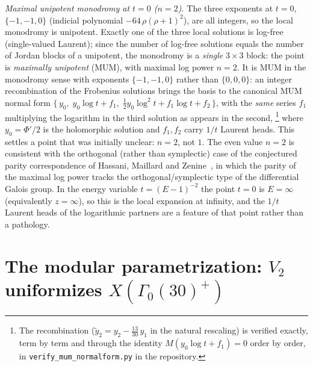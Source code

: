 \documentclass[cntp]{ipart}
\theoremstyle{plain}
\theoremstyle{remark}
\begin{document}
\emph{Maximal unipotent monodromy at $t=0$ ($n=2$).} The three exponents at $t=0$, $\{-1,-1,0\}$ (indicial
polynomial $-64\,\rho(\rho+1)^2$), are all integers, so the local monodromy is unipotent. Exactly one of the three
local solutions is log-free (single-valued Laurent); since the number of log-free solutions equals the number of
Jordan blocks of a unipotent, the monodromy is a \emph{single} $3\times3$ block: the point is \emph{maximally
unipotent} (MUM), with maximal log power $n=2$. It is MUM in the monodromy sense with exponents $\{-1,-1,0\}$
rather than $\{0,0,0\}$: an integer recombination of the Frobenius solutions brings the basis to the canonical MUM
normal form $\{\,y_0,\;y_0\log t+f_1,\;\tfrac12 y_0\log^2t+f_1\log t+f_2\,\}$, with the \emph{same} series $f_1$
multiplying the logarithm in the third solution as appears in the second,%
\footnote{The recombination ($\tilde y_2=y_2-\tfrac{13}{30}\,y_1$ in the natural rescaling) is verified exactly, term by term and through the identity
$M(y_0\log t+f_1)=0$ order by order, in \texttt{verify\_mum\_normalform.py} in the repository.}
where $y_0=\Phi'/2$ is the holomorphic solution and $f_1,f_2$ carry $1/t$ Laurent heads. This settles a point that
was initially unclear: $n=2$, not $1$. The even value $n=2$ is consistent with the orthogonal (rather than
symplectic) case of the conjectured parity correspondence of Hassani, Maillard and Zenine~\cite{HMZ2025}, in which the parity
of the maximal log power tracks the orthogonal/symplectic type of the differential Galois group. In the energy
variable $t=(E-1)^{-2}$ the point $t=0$ is $E=\infty$ (equivalently $z=\infty$), so this is the local expansion at
infinity, and the $1/t$ Laurent heads of the logarithmic partners are a feature of that point rather than a
pathology.

\section{The modular parametrization: \texorpdfstring{$V_2$ uniformizes $X(\Gamma_0(30)^+)$}{V2 uniformizes X(Gamma0(30)+)}}
\label{sec:modular}
\end{document}
